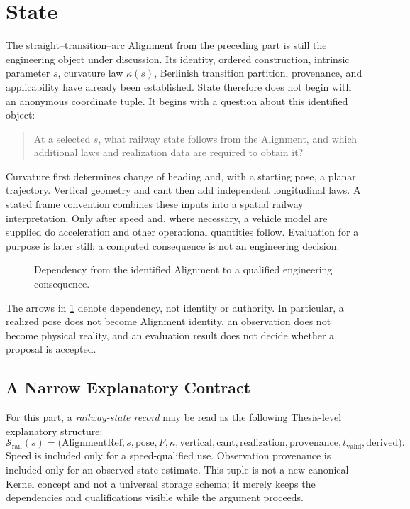 
\chapter*{State}
{}

The straight--transition--arc Alignment from the preceding part is still the
engineering object under discussion. Its identity, ordered construction,
intrinsic parameter \(s\), curvature law \(\kappa(s)\), Berlinish transition
partition, provenance, and applicability have already been established.
State therefore does not begin with an anonymous coordinate tuple. It begins
with a question about this identified object:

\begin{quote}
At a selected \(s\), what railway state follows from the Alignment, and which
additional laws and realization data are required to obtain it?
\end{quote}

Curvature first determines change of heading and, with a starting pose, a
planar trajectory. Vertical geometry and cant then add independent
longitudinal laws. A stated frame convention combines these inputs into a
spatial railway interpretation. Only after speed and, where necessary, a
vehicle model are supplied do acceleration and other operational quantities
follow. Evaluation for a purpose is later still: a computed consequence is
not an engineering decision.

\begin{figure}[htbp]
\centering

\caption{Dependency from the identified Alignment to a qualified engineering consequence.}
\label{fig:railway-state-dependency}
\end{figure}

The arrows in \cref{fig:railway-state-dependency} denote dependency, not
identity or authority. In particular, a realized pose does not become
Alignment identity, an observation does not become physical reality, and an
evaluation result does not decide whether a proposal is accepted.

\section*{A Narrow Explanatory Contract}

For this part, a \emph{railway-state record} may be read as the following
Thesis-level explanatory structure:
\[
\mathcal S_{\mathrm{rail}}(s)=
\bigl(
\mathrm{AlignmentRef},s,\mathrm{pose},F,\kappa,
\mathrm{vertical},\mathrm{cant},\mathrm{realization},
\mathrm{provenance},t_{\mathrm{valid}},\mathrm{derived}
\bigr).
\]
Speed is included only for a speed-qualified use. Observation provenance is
included only for an observed-state estimate. This tuple is not a new
canonical Kernel concept and not a universal storage schema; it merely keeps
the dependencies and qualifications visible while the argument proceeds.

